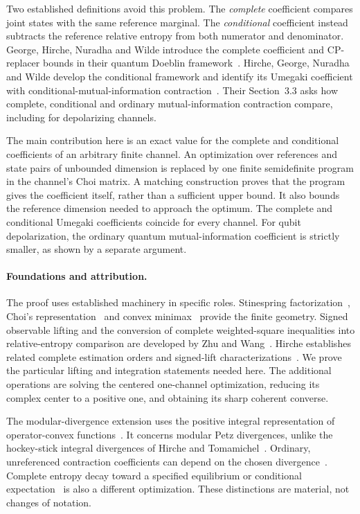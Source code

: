 \documentclass[11pt]{article}
\numberwithin{equation}{section}
\theoremstyle{definition}
\theoremstyle{remark}
\begin{document}
Two established definitions avoid this problem. The \emph{complete} coefficient
compares joint states with the same reference marginal. The \emph{conditional}
coefficient instead subtracts the reference relative entropy from both numerator
and denominator. George, Hirche, Nuradha and Wilde introduce the complete
coefficient and CP-replacer bounds in their quantum Doeblin
framework~\cite[Definition~11 and Section~6.1]{GHNW26}. Hirche, George, Nuradha
and Wilde develop the conditional framework and identify its Umegaki coefficient
with conditional-mutual-information contraction~\cite[Theorem~1 and
Corollary~3]{HGNW26}. Their Section~3.3 asks how complete, conditional and ordinary
mutual-information contraction compare, including for depolarizing channels.

The main contribution here is an exact value for the complete and conditional
coefficients of an arbitrary finite channel. An optimization over references and
state pairs of unbounded dimension is replaced by one finite semidefinite
program in the channel's Choi matrix. A matching construction proves that the
program gives the coefficient itself, rather than a sufficient upper bound.
It also bounds the reference dimension needed to approach the optimum. The
complete and conditional Umegaki coefficients coincide for every channel. For
qubit depolarization, the ordinary quantum mutual-information coefficient is
strictly smaller, as shown by a separate argument.

\paragraph{Foundations and attribution.}
The proof uses established machinery in specific roles. Stinespring
factorization~\cite{Stinespring55}, Choi's representation~\cite{Choi75} and
convex minimax~\cite{Sion58} provide the finite geometry. Signed observable
lifting and the conversion of complete weighted-square inequalities into
relative-entropy comparison are developed by Zhu and
Wang~\cite[Definition~S3, Proposition~S4, Theorem~S5 and Lemmas~S2,
S6--S7]{ZW26v3}. Hirche establishes related complete estimation orders and
signed-lift characterizations~\cite[Theorem~3.2 and Proposition~3.5]{Hirche26}.
We prove the particular lifting and integration statements needed here. The
additional operations are solving the centered one-channel optimization,
reducing its complex center to a positive one, and obtaining its sharp coherent
converse.

The modular-divergence extension uses the positive integral representation of
operator-convex functions~\cite[Theorem~2.2]{FH14}. It concerns modular Petz
divergences, unlike the hockey-stick integral divergences of
Hirche and Tomamichel~\cite{HT24}. Ordinary, unreferenced contraction coefficients
can depend on the chosen divergence~\cite{HR15}. Complete entropy decay toward
a specified equilibrium or conditional expectation~\cite{GR22} is also a
different optimization. These distinctions are material, not changes of notation.
\end{document}
